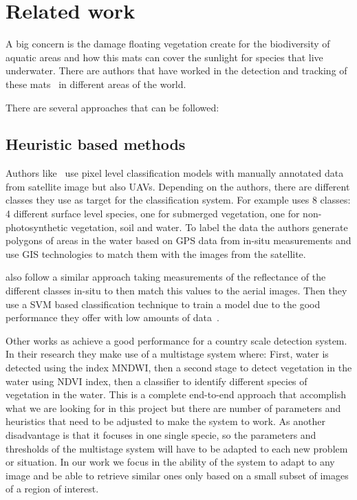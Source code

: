 \documentclass[conference]{IEEEtran}
\begin{document}
    \section{Related work}
    A big concern is the damage floating vegetation create for the biodiversity of aquatic areas and how this mats can cover the sunlight for species that live underwater.
    There are authors that have worked in the detection and tracking of these mats~\cite{donyana1, donyana2,rs14133013, srilanka_veg, 10.3389/fmars.2022.1004012} in different areas of the world.

    There are several approaches that can be followed:
    \subsection*{Heuristic based methods}

    Authors like~\citet{srilanka_veg, 10.3389/fmars.2022.1004012} use pixel level classification models with manually annotated data from satellite image but also UAVs.
    Depending on the authors, there are different classes they use as target for the classification system.
    For example \citet{rs14133013} uses 8 classes: 4 different surface level species, one for submerged vegetation, one for non-photosynthetic vegetation, soil and water.
    To label the data the authors generate polygons of areas in the water based on GPS data from in-situ measurements and use GIS technologies to match them with the images from the satellite.

    \citet{10.3389/fmars.2022.1004012} also follow a similar approach taking measurements of the reflectance of the different classes in-situ to then match this values to the aerial images.
    Then they use a SVM based classification technique to train a model due to the good performance they offer with low amounts of data~\cite{Cortes1995}.

    Other works as \citet{rs12244021} achieve a good performance for a country scale detection system.
    In their research they make use of a multistage system where: First, water is detected using the index MNDWI, then a second stage to detect vegetation in the water using NDVI index, then a classifier to
    identify different species of vegetation in the water.
    This is a complete end-to-end approach that accomplish what we are looking for in this project but there are number of parameters and heuristics that need to be adjusted to make the system to work.
    As another disadvantage is that it focuses in one single specie, so the parameters and thresholds of the multistage system will have to be adapted to each new problem or situation.
    In our work we focus in the ability of the system to adapt to any image and be able to retrieve similar ones only based on a small subset of images of a region of interest.
\end{document}
